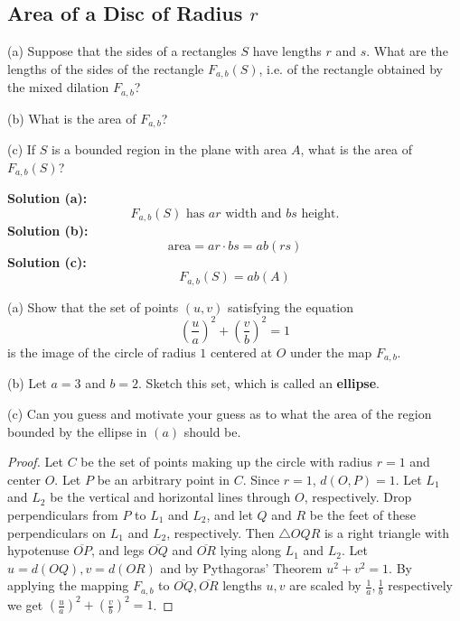 \subsection{Area of a Disc of Radius $r$}

\begin{tcolorbox}[title=Problem 3, breakable]
    (a) Suppose that the sides of a rectangles $S$ have lengths 
        $r$ and $s$. What are the lengths of the sides  of the 
        rectangle $F_{a, b}(S)$, i.e. of the rectangle obtained 
        by the mixed dilation $F_{a, b}$?

    (b) What is the area of $F_{a, b}$?

    (c) If $S$ is a bounded region in the plane with area $A$,
        what is the area of $F_{a, b}(S)$?
\end{tcolorbox}

\textbf{Solution (a):}
\[F_{a, b}(S) \text{ has } ar \text{ width and } bs \text{ height.}\]
\textbf{Solution (b):}
\[\text{area}= ar \cdot bs = ab(rs)\]
\textbf{Solution (c):}
\[F_{a, b}(S) = ab(A)\]

\begin{tcolorbox}[title=Problem 4, breakable]
    (a) Show that the set of points $(u, v)$ satisfying the equation
        \[\left(\frac{u}{a}\right)^2 + \left(\frac{v}{b}\right)^2 = 1\]
        is the image of the circle of radius $1$ centered at $O$ under 
        the map $F_{a, b}$.

    (b) Let $a = 3$ and $b = 2$. Sketch this set, which is called an 
        \textbf{ellipse}.

    (c) Can you guess and motivate your guess as to what the area of the 
        region bounded by the ellipse in $(a)$ should be.
\end{tcolorbox}

\begin{proof}
    Let $C$ be the set of points making up the circle with radius $r = 1$ and center $O$.
    Let $P$ be an arbitrary point in $C$. Since $r = 1$, $d(O, P) = 1$.
    Let $L_1$ and $L_2$ be the vertical and horizontal lines through $O$, respectively.
    Drop perpendiculars from $P$ to $L_1$ and $L_2$, 
        and let $Q$ and $R$ be the feet of these perpendiculars on $L_1$ and $L_2$, respectively.
    Then $\triangle OQR$ is a right triangle with hypotenuse $\overline{OP}$, 
        and legs $\overline{OQ}$ and $\overline{OR}$ lying along $L_1$ and $L_2$.
    Let $u = d(OQ), v = d(OR)$ and by Pythagoras' Theorem $u^2 + v^2 = 1$.
    By applying the mapping $F_{a, b}$ to $\overline{OQ}, \overline{OR}$ 
        lengths $u, v$ are scaled by $\frac{1}{a}, \frac{1}{b}$ respectively
        we get $\left(\frac{u}{a}\right)^2 + \left(\frac{v}{b}\right)^2 = 1$.
\end{proof}

